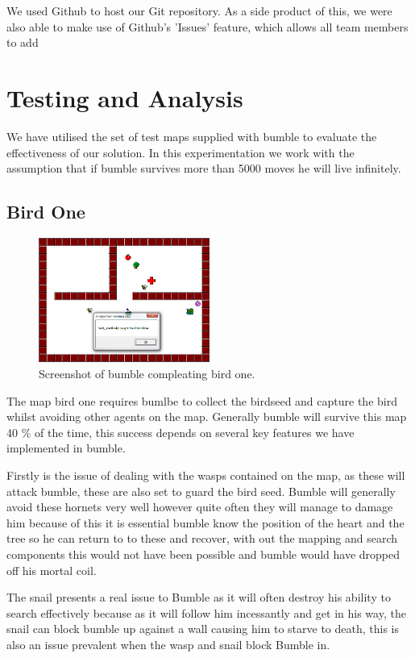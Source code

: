 \documentclass[a4paper,oneside]{report}
\begin{document}
We used Github to host our Git repository. As a side product of this, we were also able to make use of Github's 'Issues' feature, which allows all team members to add 
	
\section{Testing and Analysis}

We have utilised the set of test maps supplied with bumble to evaluate the effectiveness of our solution. In this experimentation we work with the assumption that if bumble survives more than 5000 moves he will live infinitely.
	
	\subsection{Bird One}

		\begin{figure}[h!]
		  \caption{Screenshot of bumble compleating bird one.}
		  \centering
			\includegraphics[width=0.5\textwidth]{bumbleBird1.png}
		\end{figure}


	The map bird one requires bumlbe to collect the birdseed and capture the bird whilst avoiding other agents on the map.  Generally bumble will survive this map 40 \% of the time, this success depends on several key features we have implemented in bumble. 
	
	Firstly is the issue of dealing with the wasps contained on the map, as these will attack bumble, these are also set to guard the bird seed. Bumble will generally avoid these hornets very well however quite often they will manage to damage him because of this it is essential bumble know the position of the heart and the tree so he can return to to these and recover, with out the mapping and search components this would not have been possible and bumble would have dropped off his mortal coil. 
	
	The snail presents a real issue to Bumble as it will often destroy his ability to search effectively because as it will follow him incessantly and get in his way, the snail can block bumble up against a wall causing him to starve to death, this is also an issue prevalent when the wasp and snail block Bumble in.
\end{document}
